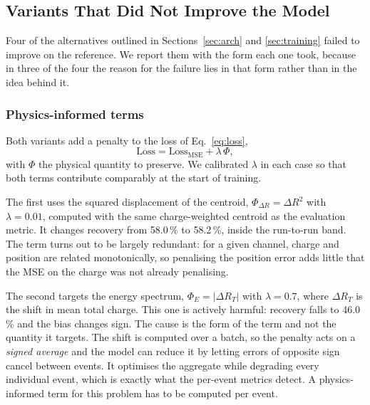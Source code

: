 \documentclass[10pt,conference]{IEEEtran}
\begin{document}
\subsection{Variants That Did Not Improve the Model}
\label{sec:res-negative}

Four of the alternatives outlined in Sections~\ref{sec:arch} and
\ref{sec:training} failed to improve on the reference. We report them with the
form each one took, because in three of the four the reason for the failure lies
in that form rather than in the idea behind it.

\subsubsection{Physics-informed terms}
Both variants add a penalty to the loss of Eq.~\ref{eq:loss},
%
\begin{equation}
\mathrm{Loss} = \mathrm{Loss}_{\mathrm{MSE}} + \lambda \, \Phi,
\label{eq:physloss}
\end{equation}
%
with $\Phi$ the physical quantity to preserve. We calibrated $\lambda$ in each
case so that both terms contribute comparably at the start of training.

The first uses the squared displacement of the centroid,
$\Phi_{\Delta R} = \Delta R^{2}$ with $\lambda = 0.01$, computed with the same
charge-weighted centroid as the evaluation metric. It changes recovery from
58.0\,\% to 58.2\,\%, inside the run-to-run band. The term turns out to be
largely redundant: for a given channel, charge and position are related
monotonically, so penalising the position error adds little that the MSE on the
charge was not already penalising.

The second targets the energy spectrum, $\Phi_{E} = \lvert \Delta R_{T} \rvert$
with $\lambda = 0.7$, where $\Delta R_{T}$ is the shift in mean total charge.
This one is actively harmful: recovery falls to 46.0\,\% and the bias changes
sign. The cause is the form of the term and not the quantity it targets. The
shift is computed over a batch, so the penalty acts on a \emph{signed average}
and the model can reduce it by letting errors of opposite sign cancel between
events. It optimises the aggregate while degrading every individual event, which
is exactly what the per-event metrics detect. A physics-informed term for this
problem has to be computed per event.
\end{document}
